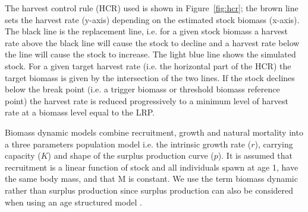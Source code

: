 \documentclass[%
nonumbib,      %
%
]{nrc1}                          %
\begin{document}
The harvest control rule (HCR) used is shown in Figure~\ref{fig:hcr}; the brown line sets the harvest rate (y-axis) depending on the estimated stock biomass (x-axis). The black line is the replacement line, i.e. for a given stock biomass a harvest rate above the black line will cause the stock to decline and a harvest rate below the line will cause the stock to increase. The light blue line shows the simulated stock. For a given target harvest rate (i.e. the horizontal part of the HCR) the target biomass is given by the intersection of the two lines. If the stock declines below the break point (i.e. a trigger biomass or threshold biomass reference point) the harvest rate is reduced progressively to a minimum level of harvest rate at a biomass level equal to the LRP.

Biomass dynamic models combine recruitment, growth and natural mortality into a three parameters population model i.e.  the intrinsic growth rate ($r$), carrying capacity ($K$) and shape of the surplus production curve ($p$).  It is assumed that recruitment is a linear function of stock and all individuals spawn at age 1, have the same body mass, and that M is constant. We use the term biomass dynamic rather than surplus production since surplus production can also be considered when using an age structured model \citep{hilborn_quantitative_1992}. 







\end{document}
